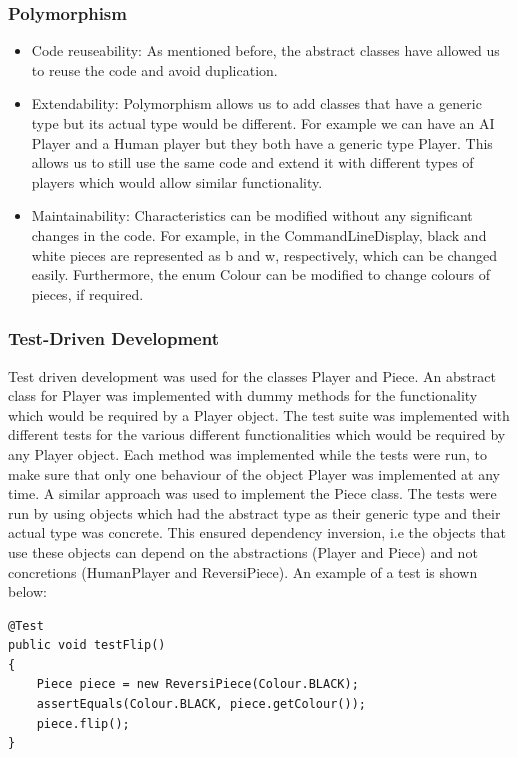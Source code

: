 \documentclass[english]{article}
\begin{document}
\subsubsection{Polymorphism}
\begin{itemize}
\item Code reuseability: As mentioned before, the abstract classes have
allowed us to reuse the code and avoid duplication. 
\item Extendability: Polymorphism allows us to add classes that have a generic
type but its actual type would be different. For example we can have
an AI Player and a Human player but they both have a generic type
Player. This allows us to still use the same code and extend it with
different types of players which would allow similar functionality.
\item Maintainability: Characteristics can be modified without any significant
changes in the code. For example, in the CommandLineDisplay, black
and white pieces are represented as b and w, respectively, which can
be changed easily. Furthermore, the enum Colour can be modified to
change colours of pieces, if required.
\end{itemize}

\subsubsection{Test-Driven Development}

Test driven development was used for the classes Player and Piece.
An abstract class for Player was implemented with dummy methods for
the functionality which would be required by a Player object. The
test suite was implemented with different tests for the various different
functionalities which would be required by any Player object. Each
method was implemented while the tests were run, to make sure that
only one behaviour of the object Player was implemented at any time.
A similar approach was used to implement the Piece class. The tests
were run by using objects which had the abstract type as their generic
type and their actual type was concrete. This ensured dependency inversion,
i.e the objects that use these objects can depend on the abstractions
(Player and Piece) and not concretions (HumanPlayer and ReversiPiece).
An example of a test is shown below:
\begin{verbatim}
@Test
public void testFlip()
{
    Piece piece = new ReversiPiece(Colour.BLACK);
    assertEquals(Colour.BLACK, piece.getColour());
    piece.flip();
}
\end{verbatim}
\end{document}
